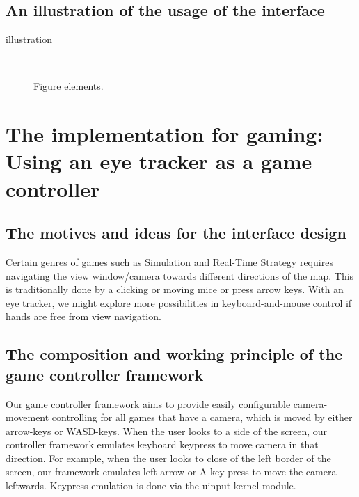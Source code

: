 \documentclass[english]{tktltiki}
\begin{document}
\subsection{An illustration of the usage of the interface}

{illustration}
\begin{figure}[h]
\ \newline
\begin{center}
\caption{Figure elements.}
\label{kuvaesimerkki}
\end{center}
\end{figure}




\section{The implementation for gaming: Using an eye tracker as a game controller}


\subsection{The motives and ideas for the interface design}

Certain genres of games such as Simulation and Real-Time Strategy requires navigating the view window/camera towards different directions of the map. This is traditionally done by a clicking or moving mice or press arrow keys. With an eye tracker, we might explore more possibilities in keyboard-and-mouse control if hands are free from view navigation. 


\subsection{The composition and working principle of the game controller framework}

Our game controller framework aims to provide easily configurable camera-movement controlling for all games that have a camera, which is moved by either arrow-keys or WASD-keys. When the user looks to a side of the screen, our controller framework emulates keyboard keypress to move camera in that direction. For example, when the user looks to close of the left border of the screen, our framework emulates left arrow or A-key press to move the camera leftwards. Keypress emulation is done via the uinput kernel module.
\end{document}
